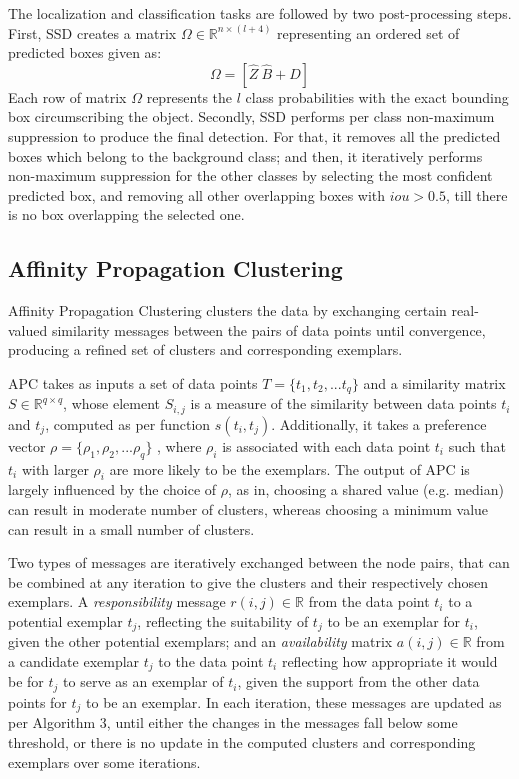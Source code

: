 \documentclass[conference]{IEEEtran}
\begin{document}
The localization and classification tasks are followed by two post-processing steps. First, SSD creates a matrix $\Omega \in \mathbb{R}^{n \times (l+4)}$ representing an ordered set of predicted boxes given as: 
\begin{equation}
\Omega = [\hat{Z}\ \hat{B}+D]
\end{equation}
Each row of matrix $\Omega$ represents the $l$ class probabilities with the exact bounding box circumscribing the object. Secondly, SSD performs per class non-maximum suppression to produce the final detection. For that, it removes all the predicted boxes which belong to the background class; and then, it iteratively performs non-maximum suppression for the other classes by selecting the most confident predicted box, and removing all other overlapping boxes with $iou > 0.5$, till there is no box overlapping the selected one. 
 
\subsection{Affinity Propagation Clustering}
Affinity Propagation Clustering clusters the data by exchanging certain real-valued similarity messages between the pairs of data points until convergence, producing a refined set of clusters and corresponding exemplars.

APC takes as inputs a set of data points $T = \{t_1, t_2, ... t_q\}$ and a similarity matrix  $S \in \mathbb{R}^{q \times q}$, whose element  $S_{i, j}$ is a measure of the similarity between data points $t_i$ and $t_j $, computed as per function $s(t_i, t_j)$. Additionally, it takes a preference vector $\rho  = \{\rho_1, \rho_2, ... \rho_q\}$ , where $\rho_i$ is associated with each data point $t_i$ such that $t_i$ with larger $\rho_i$ are more likely to be the  exemplars. The output of APC is largely influenced by the choice of  $\rho$, as in, choosing a shared value (e.g. median) can result in moderate number of clusters, whereas choosing a minimum value can result in a small number of clusters.
 
Two types of messages are iteratively exchanged between the node pairs, that can be combined at any iteration to give the clusters and their respectively chosen exemplars. A \textit{responsibility} message $r(i, j) \in \mathbb{R}$ from the data point  $t_i$ to a potential exemplar $t_j$, reflecting the suitability of  $t_j$ to be an exemplar for  $t_i$, given the other potential exemplars; and  an \textit{availability} matrix  $a(i, j) \in \mathbb{R}$ from a candidate exemplar  $t_j$ to the data point  $t_i$ reflecting how appropriate it would be for  $t_j$ to serve as an exemplar of  $t_i$, given the support from the other data points for  $t_j$ to be an exemplar. In each iteration, these messages are updated as per Algorithm 3, until either the changes in the messages fall below some threshold, or there is no update in the computed clusters and  corresponding exemplars over some iterations. 
\end{document}
